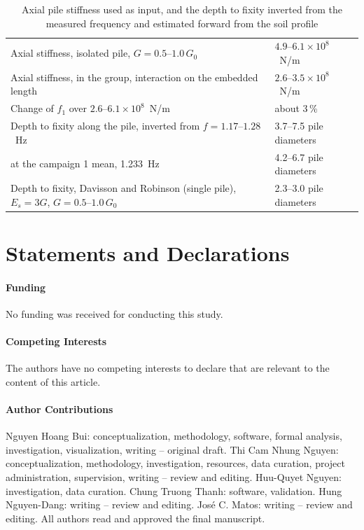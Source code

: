 \documentclass[11pt]{article}
\begin{document}
\begin{table}[htbp]
\centering
\caption{Axial pile stiffness used as input, and the depth to fixity inverted from the measured frequency and estimated forward from the soil profile}
\label{tab:stiffness}
\begin{tabularx}{\linewidth}{@{}LL@{}}
\toprule
Axial stiffness, isolated pile, $G = 0.5$--$1.0\,G_0$ & $4.9$--$6.1\times10^{8}$~N/m \\
Axial stiffness, in the group, interaction on the embedded length & $2.6$--$3.5\times10^{8}$~N/m \\
Change of $f_1$ over $2.6$--$6.1\times10^{8}$~N/m & about 3\,\% \\
Depth to fixity along the pile, inverted from $f = 1.17$--$1.28$~Hz & 3.7--7.5 pile diameters \\
\quad at the campaign 1 mean, 1.233~Hz & 4.2--6.7 pile diameters \\
Depth to fixity, Davisson and Robinson (single pile), $E_s = 3G$, $G = 0.5$--$1.0\,G_0$ & 2.3--3.0 pile diameters \\
\bottomrule
\end{tabularx}
\end{table}

\section*{Statements and Declarations}

\paragraph{Funding} No funding was received for conducting this study.

\paragraph{Competing Interests} The authors have no competing interests to declare that are relevant to the content of this article.

\paragraph{Author Contributions} Nguyen Hoang Bui: conceptualization, methodology, software, formal analysis, investigation, visualization, writing -- original draft. Thi Cam Nhung Nguyen: conceptualization, methodology, investigation, resources, data curation, project administration, supervision, writing -- review and editing. Huu-Quyet Nguyen: investigation, data curation. Chung Truong Thanh: software, validation. Hung Nguyen-Dang: writing -- review and editing. Jos\'e C. Matos: writing -- review and editing. All authors read and approved the final manuscript.
\end{document}

